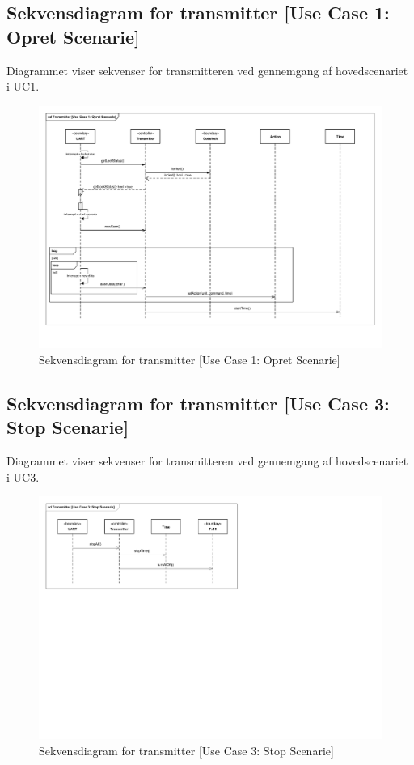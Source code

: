 \clearpage
\begin{landscape}
\subsection{Sekvensdiagram for transmitter [Use Case 1: Opret Scenarie]}
Diagrammet viser sekvenser for transmitteren ved gennemgang af hovedscenariet i UC1.
\begin{figure}[h]
	\centering %
	\includegraphics[height={\textwidth - 3.2 cm},trim=18 50 17 17, clip=true]{Systemarkitektur/Diagrammer/Transmitter_UC1_Sekvens.pdf}%
	\caption{Sekvensdiagram for transmitter [Use Case 1: Opret Scenarie]}
	\label{fig:Trans_UC1Sek}
\end{figure}
\end{landscape}

\clearpage
\subsection{Sekvensdiagram for transmitter [Use Case 3: Stop Scenarie]}
Diagrammet viser sekvenser for transmitteren ved gennemgang af hovedscenariet i UC3.
\begin{figure}[h]
	\centering
	\includegraphics[width=\textwidth, trim=17 365 353 18, clip=true]{Systemarkitektur/Diagrammer/Transmitter_UC3_Sekvens.pdf}
	\caption{Sekvensdiagram for transmitter [Use Case 3: Stop Scenarie]}
	\label{fig:Trans_UC3Sek}
\end{figure}


